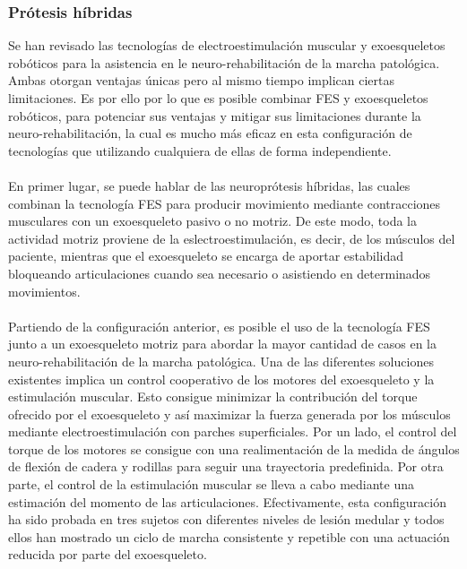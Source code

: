 \subsubsection{Prótesis híbridas}\label{protesis_hibridas}
Se han revisado las tecnologías de electroestimulación muscular y exoesqueletos robóticos para la asistencia en le neuro-rehabilitación de la marcha patológica. Ambas otorgan ventajas únicas pero al mismo tiempo implican ciertas limitaciones. Es por ello por lo que es posible combinar  FES y exoesqueletos robóticos, para potenciar sus ventajas y mitigar sus limitaciones durante la neuro-rehabilitación, la cual es mucho más eficaz en esta configuración de tecnologías que utilizando cualquiera de ellas de forma independiente\cite{protesis_hibridas}.
\\
\\
En primer lugar, se puede hablar de las neuroprótesis híbridas, las cuales combinan la tecnología FES para producir movimiento mediante contracciones musculares con un exoesqueleto pasivo o no motriz. De este modo, toda la actividad motriz proviene de la eslectroestimulación, es decir, de los músculos del paciente, mientras que el exoesqueleto se encarga de aportar estabilidad bloqueando articulaciones cuando sea necesario o asistiendo en determinados movimientos.
\\
\\
Partiendo de la configuración anterior, es posible el uso de la tecnología FES junto a un exoesqueleto motriz para abordar la mayor cantidad de casos en la neuro-rehabilitación de la marcha patológica. Una de las diferentes soluciones existentes implica un control cooperativo de los motores del exoesqueleto y la estimulación muscular. Esto consigue minimizar la contribución del torque ofrecido por el exoesqueleto y así maximizar la fuerza generada por los músculos mediante electroestimulación con parches superficiales\cite{FES_exoesqueleto_motriz}. Por un lado, el control del torque de los motores se consigue con una realimentación de la medida de ángulos de flexión de cadera y rodillas para seguir una trayectoria predefinida. Por otra parte, el control de la estimulación muscular se lleva a cabo mediante una estimación del momento de las articulaciones. Efectivamente, esta configuración ha sido probada en tres sujetos con diferentes niveles de lesión medular y todos ellos han mostrado un ciclo de marcha consistente y repetible con una actuación reducida por parte del exoesqueleto\cite{FES_exoesqueleto_motriz}.
\\
\\
